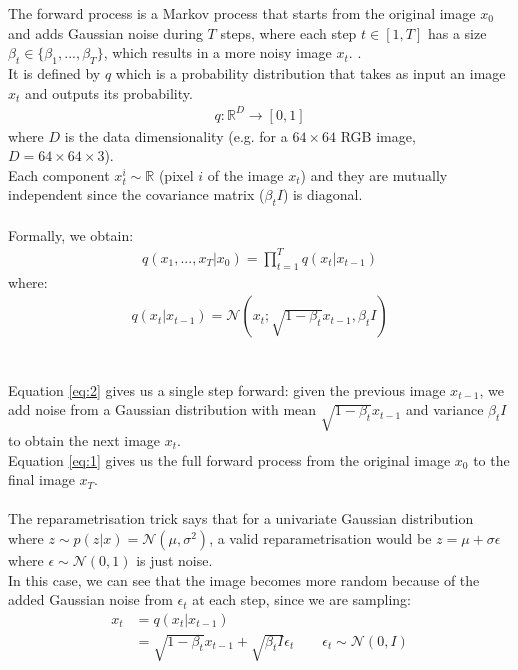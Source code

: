 \documentclass{article}
\begin{document}
The forward process is a Markov process that starts from the original image $x_0$ and adds Gaussian noise during $T$ steps, where each step $t \in \left[1, T\right]$ has a size $\beta_t \in \{ \beta_1, ..., \beta_T \}$, which results in a more noisy image $x_t$. \cite{ho2020denoising}. \\
It is defined by $q$ which is a probability distribution that takes as input an image $x_{t}$ and outputs its probability.
\begin{align}
  q: \mathbb{R}^D \rightarrow [0, 1]
\end{align}
where $D$ is the data dimensionality (e.g. for a $64 \times 64$ RGB image, $D = 64 \times 64 \times 3$). \\
Each component $x_t^i \sim \mathbb{R}$ (pixel $i$ of the image $x_t$) and they are mutually independent since the covariance matrix ($\beta_t I$) is diagonal.
\\\\
Formally, we obtain:
\begin{align}
  q\left(x_{1},..., x_{T} | x_0\right) = \prod_{t = 1}^T{q\left(x_t | x_{t - 1}\right)}
\end{align}
where:
\begin{align}
  q\left(x_t | x_{t-1}\right) = \mathcal{N}\left(x_t; \sqrt{1 - \beta_t}x_{t-1}, \beta_t I\right)
\end{align}
\\\\
Equation \ref{eq:2} gives us a single step forward: given the previous image $x_{t-1}$, we add noise from a Gaussian distribution with mean $\sqrt{1 - \beta_t}x_{t-1}$ and variance $\beta_t I$ to obtain the next image $x_t$. \\
Equation \ref{eq:1} gives us the full forward process from the original image $x_0$ to the final image $x_T$.
\\\\
The reparametrisation trick says that for a univariate Gaussian distribution where $z \sim p\left(z | x\right) = \mathcal{N}\left(\mu, \sigma^2\right)$, a valid reparametrisation would be $z = \mu + \sigma \epsilon$ where $\epsilon \sim \mathcal{N}\left(0, 1\right)$ is just noise. \cite{kingma2022autoencoding} \\
In this case, we can see that the image becomes more random because of the added Gaussian noise from $\epsilon_t$ at each step, since we are sampling:
\begin{align}
  x_t &= q(x_t | x_{t-1}) \\
  &= \sqrt{1 - \beta_t} x_{t-1} + \sqrt{\beta_t I} \epsilon_t \qquad \epsilon_t \sim \mathcal{N}\left(0, I\right)
\end{align}
\end{document}
